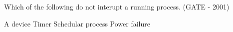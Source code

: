 
\begin{questyle}

  \question  Which of the following do not interupt a running process. (GATE - 2001)

  \begin{oneparchoices}
    \choice A device
    \choice Timer
    \CorrectChoice Schedular process
    \choice Power failure
  \end{oneparchoices}

  \end{questyle}



